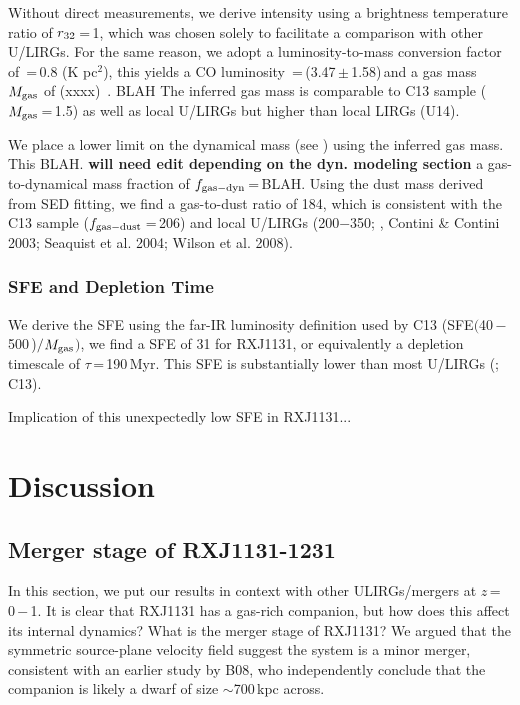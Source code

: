 \documentclass[]{emulateapj}
\begin{document}
Without direct  measurements,
we derive  intensity
using a brightness temperature ratio of $r_{\rm 32}$\,=\,1, which was chosen
solely to facilitate a comparison with other U/LIRGs.
For the same reason, we
adopt a luminosity-to-mass conversion factor of
\alphaco\,=\,0.8 (K \kms pc$^2$)\pmOne, this yields a
CO luminosity \Lp\,=\,(3.47\,$\pm$\,1.58)\,\LpU and a gas mass
$M_{\rm gas}$ of (xx\pmm xx)\, \Msun. 
BLAH
The inferred gas mass is comparable to
C13 sample ($M_{\rm gas}$\,=\,1.5\Msun) as well as
local U/LIRGs \citep{Solomon97a, Sanders96a} but higher than
local LIRGs (U14).

We place a lower limit on the dynamical mass (see ) using
the inferred gas mass. This BLAH.
 {\bf will need edit depending on the dyn. modeling section}
a gas-to-dynamical mass fraction of $f_{\rm gas-dyn}$\,=\,BLAH.
Using the dust mass derived from SED fitting,
we find a gas-to-dust ratio of 184, which is consistent with
the C13 sample ($f_{\rm gas-dust}$\,=\,206) and local U/LIRGs
(200$-$350; \citealt{Sanders91a}, Contini \& Contini 2003; Seaquist et al. 2004; Wilson et al. 2008).

\subsubsection{SFE and Depletion Time}
We derive the SFE using the far-IR luminosity definition used by
C13 (\ie SFE\pmm\LFIR$($40\,$-$\,500\,\micron)$/$$M_{\rm gas}$$)$,
we find a SFE of 31 for RXJ1131, or equivalently a depletion
timescale of $\tau$\,=\,190\,Myr. %
This SFE is substantially lower than most U/LIRGs
(\citealt{Solomon97a,Combes11a}; C13). %

Implication of this unexpectedly low SFE in RXJ1131...




\section{Discussion} \label{sec:diss}
\subsection{Merger stage of RXJ1131-1231}
In this section, we put our results in context with other ULIRGs/mergers at
$z$\,=\,0\,$-$\,1. It is clear that RXJ1131 has a
gas-rich companion, but how does this affect its internal dynamics?
What is the merger stage of RXJ1131?
We argued that the symmetric source-plane velocity field suggest
the system is a minor merger, consistent with an earlier study by B08, who
independently conclude that the companion is likely
a dwarf of size $\sim$700\,kpc across.
\end{document}
